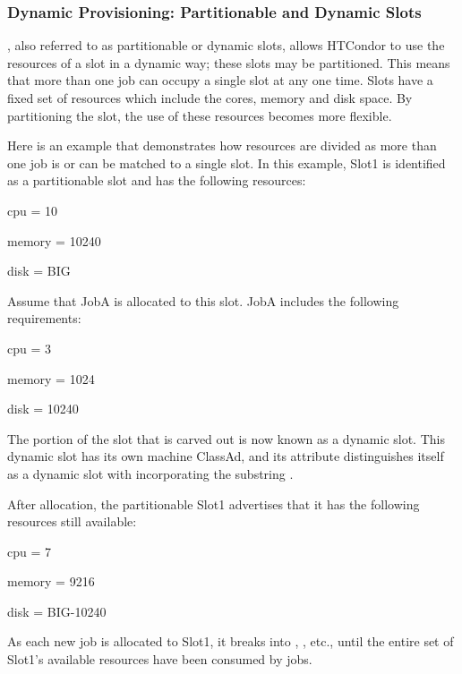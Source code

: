 \subsubsection{\label{sec:SMP-dynamicprovisioning}
Dynamic Provisioning: Partitionable and Dynamic Slots}

,
also referred to as partitionable or dynamic slots,
allows HTCondor to use the resources of a slot in a dynamic way;
these slots may be partitioned. 
This means that more than one job can occupy a single slot at any one time. 
Slots have a fixed set of resources which
include the cores, memory and disk space. 
By partitioning the slot, 
the use of these resources becomes more flexible.

Here is an example that demonstrates how resources are divided
as more than one job
is or can be matched to a single slot.
In this example, Slot1 is identified as a partitionable slot
and has the following resources:
\begin{description}
  \item{cpu = 10}
  \item{memory = 10240}
  \item{disk = BIG}
\end{description}
Assume that JobA is allocated to this slot.
JobA includes the following requirements:
\begin{description}
  \item{cpu = 3}
  \item{memory = 1024}
  \item{disk = 10240} 
\end{description}
The portion of the slot that is carved out is now
known as a dynamic slot.
This dynamic slot has its own machine ClassAd, 
and its  attribute
distinguishes itself as a dynamic slot with incorporating the substring
.

After allocation, the partitionable Slot1 advertises that it has
the following resources still available:
\begin{description}
  \item{cpu = 7}
  \item{memory = 9216}
  \item{disk = BIG-10240}
\end{description}
As each new job is allocated to Slot1,
it breaks into , ,  etc.,
until the entire set of
Slot1's available resources have been consumed by jobs.

